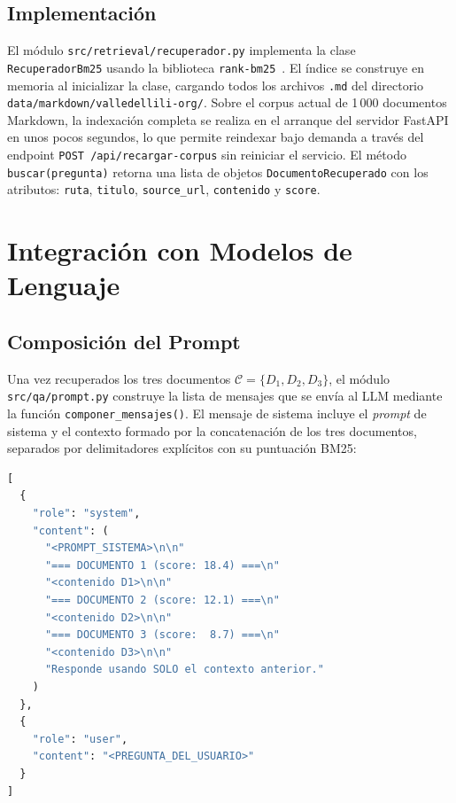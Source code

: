 \documentclass[conference]{IEEEtran}
\newcommand{\code}[1]{\texttt{\small #1}}
\begin{document}
\subsection{Implementación}

El módulo \code{src/retrieval/recuperador.py} implementa la clase
\code{RecuperadorBm25} usando la biblioteca \code{rank-bm25}~\cite{rankbm25}.
El índice se construye en memoria al inicializar la clase, cargando todos los
archivos \code{*.md} del directorio \code{data/markdown/valledellili-org/}.
Sobre el corpus actual de 1\,000 documentos Markdown, la indexación
completa se realiza en el arranque del servidor FastAPI en unos pocos
segundos, lo que permite reindexar bajo demanda a través del endpoint
\code{POST /api/recargar-corpus} sin reiniciar el servicio. El método
\code{buscar(pregunta)} retorna una lista de objetos
\code{DocumentoRecuperado} con los atributos: \code{ruta}, \code{titulo},
\code{source\_url}, \code{contenido} y \code{score}.

\section{Integración con Modelos de Lenguaje}
\label{sec:llm}

\subsection{Composición del Prompt}

Una vez recuperados los tres documentos $\mathcal{C} = \{D_1, D_2, D_3\}$,
el módulo \code{src/qa/prompt.py} construye la lista de mensajes que se
envía al LLM mediante la función \code{componer\_mensajes()}. El mensaje de
sistema incluye el \textit{prompt} de sistema y el contexto formado por la
concatenación de los tres documentos, separados por delimitadores explícitos
con su puntuación BM25:

\begin{lstlisting}[language=Python,
    caption={Estructura del mensaje enviado al LLM},
    label={lst:msgs}]
[
  {
    "role": "system",
    "content": (
      "<PROMPT_SISTEMA>\n\n"
      "=== DOCUMENTO 1 (score: 18.4) ===\n"
      "<contenido D1>\n\n"
      "=== DOCUMENTO 2 (score: 12.1) ===\n"
      "<contenido D2>\n\n"
      "=== DOCUMENTO 3 (score:  8.7) ===\n"
      "<contenido D3>\n\n"
      "Responde usando SOLO el contexto anterior."
    )
  },
  {
    "role": "user",
    "content": "<PREGUNTA_DEL_USUARIO>"
  }
]
\end{lstlisting}
\end{document}
